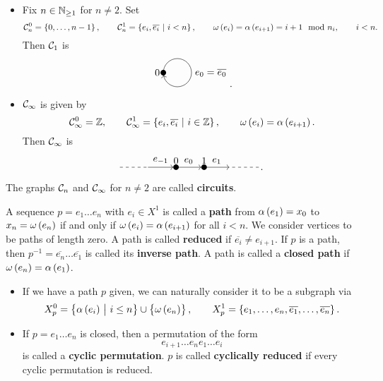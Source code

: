 \begin{example}
\hfill
\begin{itemize}
\item Fix $ n \in \mathbb{N}_{\ge 1} $ for $ n \ne 2 $. Set
$$ \CCC_n^0 = \cbr{0, \dots, n - 1}, \qquad \CCC_n^1 = \cbr{e_i, \overline{e_i} \st i < n}, \qquad \omega\br{e_i} = \alpha\br{e_{i + 1}} = i + 1 \mod n_i, \qquad i < n. $$
Then $ \mathcal{C}_1 $ is
$$
\begin{tikzpicture}
\fill (0, 0) circle (0.1) node[left]{$ 0 $};
\draw [->] (0, 0) arc (180:-170:0.5);
\draw (1, 0) node[right]{$ e_0 = \overline{e_0} $};
\end{tikzpicture}.
$$
\item $ \mathcal{C}_\infty $ is given by
$$ \CCC_\infty^0 = \ZZ, \qquad \CCC_\infty^1 = \cbr{e_i, \overline{e_i} \st i \in \ZZ}, \qquad \omega\br{e_i} = \alpha\br{e_{i + 1}}. $$
Then $ \mathcal{C}_\infty $ is
$$
\begin{tikzpicture}
\fill (0, 0) circle (0.1) node[above]{$ 0 $};
\fill (1, 0) circle (0.1) node[above]{$ 1 $};
\draw [dashed] (-2, 0) to (-1, 0);
\draw [->] (-1, 0) to node[above]{$ e_{-1} $} (-0.1, 0);
\draw [->] (0, 0) to node[above]{$ e_0 $} (0.9, 0);
\draw [->] (1, 0) to node[above]{$ e_1 $} (1.9, 0);
\draw [dashed] (2, 0) to (3, 0);
\end{tikzpicture}.
$$
\end{itemize}
The graphs $ \mathcal{C}_n $ and $ \mathcal{C}_\infty $ for $ n \ne 2 $ are called \textbf{circuits}.
\end{example}


A sequence $ p = e_1 \dots e_n $ with $ e_i \in X^1 $ is called a \textbf{path} from $ \alpha\br{e_1} = x_0 $ to $ x_n = \omega\br{e_n} $ if and only if $ \omega\br{e_i} = \alpha\br{e_{i + 1}} $ for all $ i < n $. We consider vertices to be paths of length zero. A path is called \textbf{reduced} if $ \overline{e_i} \ne e_{i + 1} $. If $ p $ is a path, then $ p^{-1} = \overline{e_n} \dots \overline{e_1} $ is called its \textbf{inverse path}. A path is called a \textbf{closed path} if $ \omega\br{e_n} = \alpha\br{e_1} $.

\begin{note*}
\hfill
\begin{itemize}
\item If we have a path $ p $ given, we can naturally consider it to be a subgraph via
$$ X_p^0 = \cbr{\alpha\br{e_i} \st i \le n} \cup \cbr{\omega\br{e_n}}, \qquad X_p^1 = \cbr{e_1, \dots, e_n, \overline{e_1}, \dots, \overline{e_n}}. $$
\item If $ p = e_1 \dots e_n $ is closed, then a permutation of the form
$$ e_{i + 1} \dots e_ne_1 \dots e_i $$
is called a \textbf{cyclic permutation}. $ p $ is called \textbf{cyclically reduced} if every cyclic permutation is reduced.
\end{itemize}
\end{note*}

